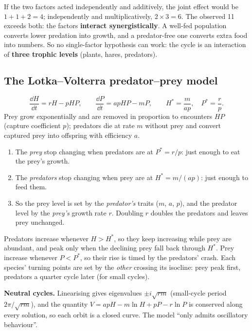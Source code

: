 \begin{chain}
If the two factors acted independently and additively, the joint effect would be $1+1+2=4$; independently and
multiplicatively, $2\times3=6$. The observed 11 exceeds both: the factors \textbf{interact synergistically}. A
well-fed population converts lower predation into growth, and a predator-free one converts extra food into
numbers. So no single-factor hypothesis can work: the cycle is an interaction of \textbf{three trophic levels}
(plants, hares, predators).
\end{chain}

\subsection{The Lotka--Volterra predator--prey model}
\[
\frac{\dd H}{\dd t}=rH-pHP,\qquad \frac{\dd P}{\dd t}=apHP-mP,\qquad
H^*=\frac{m}{ap},\quad P^*=\frac rp .
\]
Prey grow exponentially and are removed in proportion to encounters $HP$ (capture coefficient $p$); predators die at
rate $m$ without prey and convert captured prey into offspring with efficiency $a$.

\begin{chain}
\begin{enumerate}
\item The \emph{prey} stop changing when predators are at $P^*=r/p$: just enough to eat the prey's growth.
\item The \emph{predators} stop changing when prey are at $H^*=m/(ap)$: just enough to feed them.
\item So the prey level is set by the \emph{predator's} traits ($m$, $a$, $p$), and the predator level by the
\emph{prey's} growth rate $r$. Doubling $r$ doubles the predators and leaves prey unchanged.
\end{enumerate}
\end{chain}

\begin{chain}
Predators increase whenever $H>H^*$, so they keep increasing while prey are abundant, and peak only when the
declining prey fall back through $H^*$. Prey increase whenever $P<P^*$, so their rise is timed by the predators' crash.
Each species' turning points are set by the \emph{other} crossing its isocline: prey peak first, predators a quarter
cycle later (for small cycles).
\end{chain}

\textbf{Neutral cycles.} Linearising gives eigenvalues $\pm i\sqrt{rm}$ (small-cycle period $2\pi/\sqrt{rm}$), and the
quantity $V=apH-m\ln H+pP-r\ln P$ is conserved along every solution, so each orbit is a closed curve. The model
``only admits oscillatory behaviour''.


